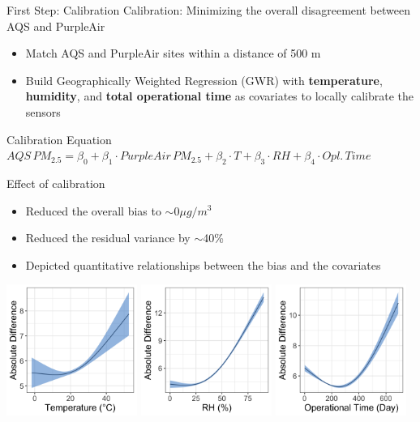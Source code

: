 \begin{frame}{First Step: Calibration}
    Calibration: Minimizing the overall disagreement between AQS and PurpleAir
    \begin{itemize}
        \item Match AQS and PurpleAir sites within a distance of 500 m
        \item Build Geographically Weighted Regression (GWR) with \textbf{temperature}, \textbf{humidity}, and \textbf{total operational time} as covariates to locally calibrate the sensors
    \end{itemize}
    \begin{block}{Calibration Equation}
    \small
    $AQS\,PM_{2.5} = \beta_0 + \beta_1\cdot PurpleAir\,PM_{2.5} + \beta_2\cdot T + \beta_3\cdot RH + \beta_4\cdot Opl.\,Time$
    \end{block}
\end{frame}

\begin{frame}{Effect of calibration}
    \begin{itemize}
        \item Reduced the overall bias to $\sim 0 \mu g/m^3$
        \item Reduced the residual variance by $\sim$40\%
        \item Depicted quantitative relationships between the bias and the covariates
    \end{itemize}
    \begin{center}
        \includegraphics[width=0.32\textwidth]{img/temp.png}
        \includegraphics[width=0.32\textwidth]{img/rh.png}
        \includegraphics[width=0.32\textwidth]{img/time.png}
    \end{center}
\end{frame}

